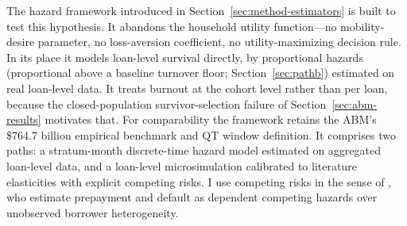 \documentclass[12pt]{article}
\begin{document}
The hazard framework introduced in Section~\ref{sec:method-estimators} is built to test this hypothesis. It abandons the household utility function---no mobility-desire parameter, no loss-aversion coefficient, no utility-maximizing decision rule. In its place it models loan-level survival directly, by proportional hazards (proportional above a baseline turnover floor; Section~\ref{sec:pathb}) estimated on real loan-level data. It treats burnout at the cohort level rather than per loan, because the closed-population survivor-selection failure of Section~\ref{sec:abm-results} motivates that. For comparability the framework retains the ABM's \$764.7 billion empirical benchmark and QT window definition. It comprises two paths: a stratum-month discrete-time hazard model estimated on aggregated loan-level data, and a loan-level microsimulation calibrated to literature elasticities with explicit competing risks. I use competing risks in the sense of \citet{deng2000}, who estimate prepayment and default as dependent competing hazards over unobserved borrower heterogeneity.
\end{document}
